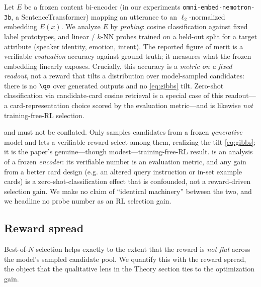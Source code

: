 \begin{definition}
\label{def:probe}
Let $E$ be a frozen content bi-encoder (in our experiments \texttt{omni-embed-nemotron-3b}, a SentenceTransformer) mapping an utterance to an $\ell_2$-normalized embedding $E(x)$. We analyze $E$ by \emph{probing}: cosine classification against fixed label prototypes, and linear / $k$-NN probes trained on a held-out split for a target attribute (speaker identity, emotion, intent). The reported figure of merit is a verifiable \emph{evaluation} accuracy against ground truth; it measures what the frozen embedding linearly exposes. Crucially, this accuracy is a \emph{metric on a fixed readout}, not a reward that tilts a distribution over model-sampled candidates: there is no $\qo$ over generated outputs and no \eqref{eq:gibbs} tilt. Zero-shot classification via candidate-card cosine retrieval is a special case of this readout---a card-representation choice scored by the evaluation metric---and is likewise \emph{not} training-free-RL selection.
\end{definition}

\begin{remark}
\label{rem:generative}
 and  must not be conflated. Only  samples candidates from a frozen \emph{generative} model and lets a verifiable reward select among them, realizing the tilt \eqref{eq:gibbs}; it is the paper's genuine---though modest---training-free-RL result.  is an analysis of a frozen \emph{encoder}: its verifiable number is an evaluation metric, and any gain from a better card design (e.g. an altered query instruction or in-set example cards) is a zero-shot-classification effect that is confounded, not a reward-driven selection gain. We make no claim of ``identical machinery'' between the two, and we headline no probe number as an RL selection gain.
\end{remark}

\subsection{Reward spread}
\label{subsec:spread}

Best-of-$N$ selection helps exactly to the extent that the reward is \emph{not flat} across the model's sampled candidate pool. We quantify this with the reward spread, the object that the qualitative lens in the Theory section ties to the optimization gain.

